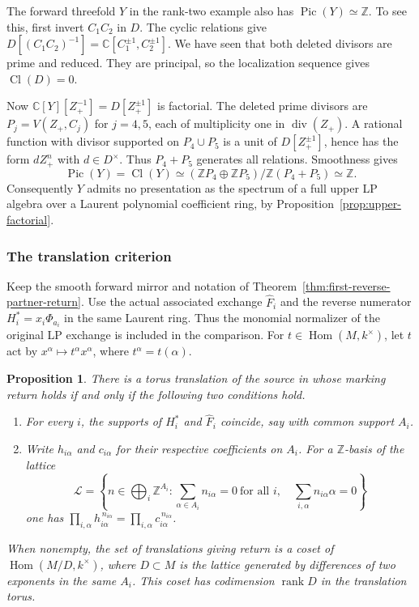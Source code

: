\documentclass[11pt,reqno]{amsart}
\numberwithin{equation}{section}
\newtheorem{proposition}[theorem]{Proposition}
\theoremstyle{definition}
\theoremstyle{remark}
\DeclareMathOperator{\Pic}{Pic}
\DeclareMathOperator{\Cl}{Cl}
\begin{document}
The forward threefold \(Y\) in the rank-two example also has
\(\Pic(Y)\simeq\mathbb Z\). To see this, first invert \(C_1C_2\)
in \(D\). The cyclic relations give
\(D[(C_1C_2)^{-1}]=\mathbb C[C_1^{\pm1},C_2^{\pm1}]\).
We have seen that both deleted divisors are prime and reduced. They
are principal, so the localization sequence gives \(\Cl(D)=0\).

Now \(\mathbb C[Y][Z_+^{-1}]=D[Z_+^{\pm1}]\) is factorial. The deleted prime
divisors are \(P_j=V(Z_+,C_j)\) for \(j=4,5\), each of multiplicity
one in \(\operatorname{div}(Z_+)\). A rational function with divisor
supported on \(P_4\cup P_5\) is a unit of \(D[Z_+^{\pm1}]\), hence
has the form \(dZ_+^n\) with \(d\in D^\times\). Thus \(P_4+P_5\)
generates all relations. Smoothness gives
\[ \Pic(Y)=\Cl(Y)\simeq (\mathbb Z P_4\oplus\mathbb Z P_5)/\mathbb Z(P_4+P_5) \simeq\mathbb Z. \]
Consequently \(Y\) admits no presentation as the spectrum of a full
upper LP algebra over a Laurent polynomial coefficient ring, by
Proposition~\ref{prop:upper-factorial}.

\subsubsection{The translation criterion}

Keep the smooth forward mirror and notation of
Theorem~\ref{thm:first-reverse-partner-return}. Use the actual
associated exchange \(\widehat F_i\) and the reverse numerator
\(H_i^*=x_i\Phi_{a_i}\) in the same Laurent ring. Thus the monomial
normalizer of the original LP exchange is included in the comparison.
For \(t\in\operatorname{Hom}(M,k^\times)\), let \(t\) act by
\(x^\alpha\mapsto t^\alpha x^\alpha\), where \(t^\alpha=t(\alpha)\).

\begin{proposition}\label{prop:torus-translate-return}
There is a torus translation of the source in whose marking return
holds if and only if the following two conditions hold.
\begin{enumerate}
\item For every \(i\), the supports of \(H_i^*\) and \(\widehat F_i\)
coincide, say with common support \(A_i\).
\item Write \(h_{i\alpha}\) and \(c_{i\alpha}\) for their respective
coefficients on \(A_i\). For a \(\mathbb Z\)-basis of the lattice
\[ \mathcal L=\left\{n\in\bigoplus_i\mathbb Z^{A_i}: \sum_{\alpha\in A_i} n_{i\alpha}=0\ \text{for all }i,\quad \sum_{i,\alpha}n_{i\alpha}\alpha=0\right\} \]
one has \(\prod_{i,\alpha}h_{i\alpha}^{\,n_{i\alpha}}
=\prod_{i,\alpha}c_{i\alpha}^{\,n_{i\alpha}}\).
\end{enumerate}
When nonempty, the set of translations giving return is a coset of
\(\operatorname{Hom}(M/D,k^\times)\), where \(D\subset M\) is the
lattice generated by differences of two exponents in the same \(A_i\).
This coset has codimension \(\operatorname{rank}D\) in the translation torus.
\end{proposition}
\end{document}
